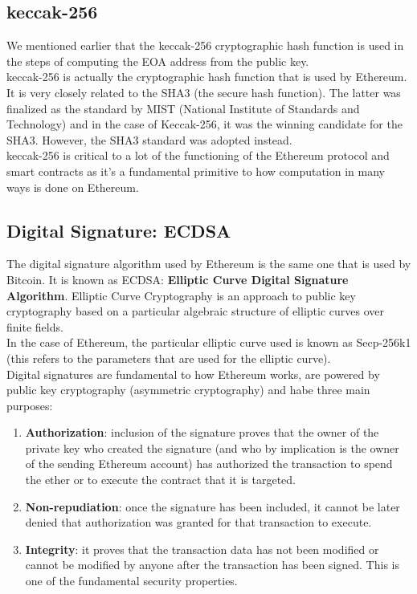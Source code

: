 \subsection*{keccak-256}

We mentioned earlier that the keccak-256 cryptographic hash function is used in the steps of computing the EOA address from the public key.\\

keccak-256 is actually the cryptographic hash function that is used by Ethereum.
It is very closely related to the SHA3 (the secure hash function).
The latter was finalized as the standard by MIST (National Institute of Standards and Technology) and in the case of Keccak-256, it was the winning candidate for the SHA3. However, the SHA3 standard was adopted instead.\\

keccak-256 is critical to a lot of the functioning of the Ethereum protocol and smart contracts as it's a fundamental primitive to how computation in many ways is done on Ethereum.

\subsection*{Digital Signature: ECDSA}

The digital signature algorithm used by Ethereum is the same one that is used by Bitcoin.
It is known as ECDSA: \textbf{Elliptic Curve Digital Signature Algorithm}.
Elliptic Curve Cryptography is an approach to public key cryptography based on a particular algebraic structure of elliptic curves over finite fields.\\ %
In the case of Ethereum, the particular elliptic curve used is known as Secp-256k1 (this refers to the parameters that are used for the elliptic curve).\\

Digital signatures are  fundamental to how Ethereum works, are powered by public key cryptography (asymmetric cryptography) and habe three main purposes:

\begin{enumerate}

    \item\textbf{Authorization}: inclusion of the signature proves that the owner of the private key who created the signature (and who by implication is the owner of the sending Ethereum account) has authorized the transaction to spend the ether or to execute the contract that it is targeted.

    \item\textbf{Non-repudiation}: once the signature has been included, it cannot be later denied that authorization was granted for that transaction to execute.

    \item\textbf{Integrity}: it proves that the transaction data has not been modified or cannot be modified by anyone after the transaction has been signed.
    This is one of the fundamental security properties.

\end{enumerate}


